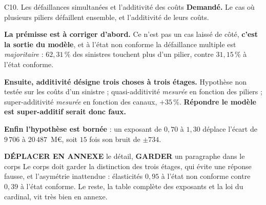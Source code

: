 \documentclass[11pt]{beamer}
\newcommand{\garder}{\textbf{GARDER}}
\newcommand{\annexer}{\textbf{DÉPLACER EN ANNEXE}}
\newcommand{\srcs}[1]{\vspace{0.8mm}{\tiny\textcolor{gray!50!black}{Sources : #1}}}
\begin{document}
\begin{frame}{C10. Les défaillances simultanées et l'additivité des coûts}
\scriptsize
\textbf{Demandé.} Le cas où plusieurs piliers défaillent ensemble, et l'additivité de leurs
coûts.
\vspace{1mm}

\textbf{La prémisse est à corriger d'abord.} Ce n'est pas un cas laissé de côté, \textbf{c'est
la sortie du modèle}, et à l'état non conforme la défaillance multiple est \emph{majoritaire} :
$62{,}31\,\%$ des sinistres touchent plus d'un pilier, contre $31{,}15\,\%$ à l'état conforme.
\vspace{1mm}

\textbf{Ensuite, \og additivité \fg{} désigne trois choses à trois étages.} Hypothèse non testée
sur les coûts d'un sinistre ; quasi-additivité \emph{mesurée} en fonction des piliers ;
super-additivité \emph{mesurée} en fonction des canaux, $+35\,\%$. \textbf{Répondre \og le
modèle est super-additif \fg{} serait donc faux.}
\vspace{1mm}

\textbf{Enfin l'hypothèse est bornée} : un exposant de $0{,}70$ à $1{,}30$ déplace l'écart de
$9\,706$ à $20\,487$~M\euro, soit $15$ fois son bruit de $\pm 734$.
\begin{block}{\annexer{} le détail, \garder{} un paragraphe dans le corps}
Le corps doit garder la distinction des trois étages, qui évite une réponse fausse, et
l'asymétrie inattendue : élasticités $0{,}95$ à l'état non conforme contre $0{,}39$ à l'état
conforme. Le reste, la table complète des exposants et la loi du cardinal, vit très bien en
annexe.
\end{block}
\srcs{script~\texttt{74}}
\end{frame}
\end{document}
